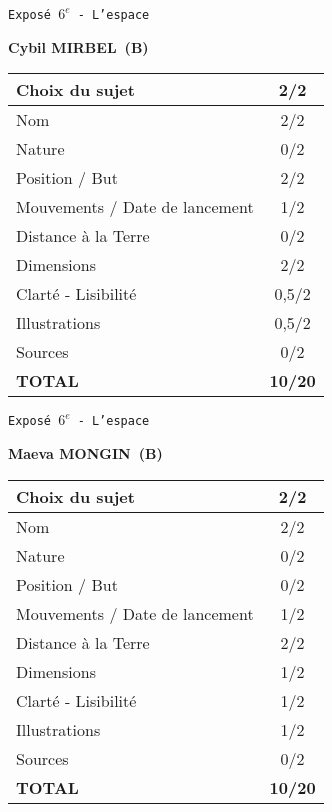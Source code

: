 	\vspace*{1cm}
	
	\newpage
	\LARGE{\texttt{Expos\'e $6^e$ - L'espace}}
	\vspace*{1cm}

	\textbf{Cybil MIRBEL\ (B)}

	\vspace*{1.5cm}
	\begin{tabular}{|l|c|}
		\hline
		Choix du sujet & 2/2 \\
		\hline
		Nom & 2/2 \\
		\hline
		Nature & 0/2 \\
		\hline
		Position / But & 2/2 \\
		\hline
		Mouvements / Date de lancement & 1/2 \\
		\hline
		Distance \`a la Terre & 0/2 \\
		\hline
		Dimensions & 2/2 \\
		\hline
		Clart\'e - Lisibilit\'e & 0,5/2 \\
		\hline
		Illustrations & 0,5/2 \\
		\hline
		Sources & 0/2 \\
		\hline
		\textbf{TOTAL}  & \textbf{10/20} \\
		\hline
	\end{tabular}

	\vspace*{1cm}
	
	\newpage
	\LARGE{\texttt{Expos\'e $6^e$ - L'espace}}
	\vspace*{1cm}

	\textbf{Maeva MONGIN\ (B)}

	\vspace*{1.5cm}
	\begin{tabular}{|l|c|}
		\hline
		Choix du sujet & 2/2 \\
		\hline
		Nom & 2/2 \\
		\hline
		Nature & 0/2 \\
		\hline
		Position / But & 0/2 \\
		\hline
		Mouvements / Date de lancement & 1/2 \\
		\hline
		Distance \`a la Terre & 2/2 \\
		\hline
		Dimensions & 1/2 \\
		\hline
		Clart\'e - Lisibilit\'e & 1/2 \\
		\hline
		Illustrations & 1/2 \\
		\hline
		Sources & 0/2 \\
		\hline
		\textbf{TOTAL}  & \textbf{10/20} \\
		\hline
	\end{tabular}

